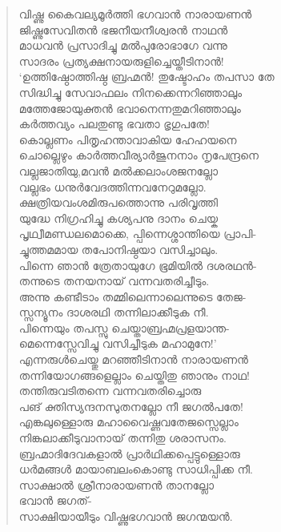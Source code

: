 \begin{verse}
വിഷ്ണു കൈവല്യമൂര്‍ത്തി ഭഗവാന്‍ നാരായണന്‍\\
ജിഷ്ണുസേവിതന്‍ ഭജനീയനീശ്വരന്‍ നാഥന്‍\\
മാധവന്‍ പ്രസാദിച്ചു മല്‍പുരോഭാഗേ വന്നു\\
സാദരം പ്രത്യക്ഷനായരുളിച്ചെയ്തീടിനാന്‍!\\
‘ഉത്തിഷ്ഠോത്തിഷ്ഠ ബ്രഹ്മന്‍! തുഷ്ടോഹം തപസാ തേ\\
സിദ്ധിച്ചു സേവാഫലം നിനക്കെന്നറിഞ്ഞാലും\\
മത്തേജോയുക്തന്‍ ഭവാനെന്നതുമറിഞ്ഞാലും\\
കര്‍ത്തവ്യം പലതുണ്ടു ഭവതാ ഭൃഗുപതേ!\\
കൊല്ലണം പിതൃഹന്താവാകിയ ഹേഹയനെ\\
ചൊല്ലെഴും കാര്‍ത്തവീര്യാര്‍ജുനനാം നൃപേന്ദ്രനെ\\
വല്ലജാതിയു,മവന്‍ മല്‍ക്കലാംശജനല്ലോ\\
വല്ലഭം ധനുര്‍വേദത്തിന്നവനേറുമല്ലോ.\\
ക്ഷത്രിയവംശമിരുപത്തൊന്നു പരിവൃത്തി\\
യുദ്ധേ നിഗ്രഹിച്ചു കശ്യപനു ദാനം ചെയ്ക\\
പൃഥ്വീമണ്ഡലമൊക്കെ, പ്പിന്നെശ്ശാന്തിയെ പ്രാപി-\\
ച്ചുത്തമമായ തപോനിഷ്ഠയാ വസിച്ചാലും.\\
പിന്നെ ഞാന്‍ ത്രേതായുഗേ ഭൂമിയില്‍ ദശരഥന്‍-\\
തന്നുടെ തനയനായ് വന്നവതരിച്ചീടും.\\
അന്നു കണ്ടീടാം തമ്മിലെന്നാലെന്നുടെ തേജ-\\
സ്സന്യൂനം ദാശരഥി തന്നിലാക്കീടുക നീ.\\
പിന്നെയും തപസ്സു ചെയ്താബ്രഹ്മപ്രളയാന്ത-\\
മെന്നെസ്സേവിച്ചു വസിച്ചീടുക മഹാമുനേ!’\\
എന്നരുള്‍ചെയ്തു മറഞ്ഞീടിനാന്‍ നാരായണന്‍\\
തന്നിയോഗങ്ങളെല്ലാം ചെയ്തിതു ഞാനും നാഥ!\\
തന്തിരുവടിതന്നെ വന്നവതരിച്ചൊരു\\
പങ് ക്തിസ്യന്ദനസുതനല്ലോ നീ ജഗല്‍പതേ!\\
എങ്കലുള്ളൊരു മഹാവൈഷ്ണവതേജസ്സെല്ലാം\\
നിങ്കലാക്കീടുവാനായ് തന്നിതു ശരാസനം.\\
ബ്രഹ്മാദിദേവകളാല്‍ പ്രാര്‍ഥിക്കപ്പെട്ടുള്ളൊരു\\
ധര്‍മങ്ങള്‍ മായാബലംകൊണ്ടു സാധിപ്പിക്ക നീ.\\
സാക്ഷാല്‍ ശ്രീനാരായണന്‍ താനല്ലോ\\ \hfill ഭവാന്‍ ജഗത്-\\
സാക്ഷിയായീടും വിഷ്ണുഭഗവാന്‍ ജഗന്മയന്‍.\\

\end{verse}
